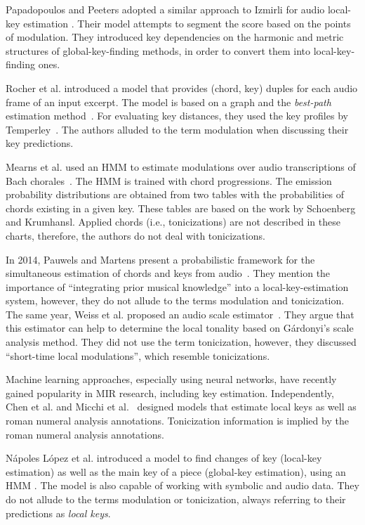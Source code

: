 \documentclass[sigconf]{acmart}
\begin{document}
Papadopoulos and Peeters adopted a similar approach to Izmirli for audio local-key estimation \cite{papadopoulos2009local}.
Their model attempts to segment the score based on the points of modulation. 
They introduced key dependencies on the harmonic and metric structures of global-key-finding methods, in order to convert them into local-key-finding ones. 

Rocher et al. introduced a model that provides (chord, key) duples for each audio frame of an input excerpt. 
The model is based on a graph and the \emph{best-path} estimation method~\cite{thomas_rocher_2010_1417485}. 
For evaluating key distances, they used the key profiles by Temperley~\cite{temperley99tonality}. The authors alluded to the term modulation when discussing their key predictions.

Mearns et al. used an HMM to estimate modulations over audio transcriptions of Bach chorales~\cite{mearns2011automatically}. 
The HMM is trained with chord progressions. 
The emission probability distributions are obtained from two tables with the probabilities of chords existing in a given key. 
These tables are based on the work by Schoenberg and Krumhansl. 
Applied chords (i.e., tonicizations) are not described in these charts, therefore, the authors do not deal with tonicizations.

In 2014, Pauwels and Martens present a probabilistic framework for the simultaneous estimation of chords and keys from audio~\cite{pauwels2014combining}. 
They mention the importance of ``integrating prior musical knowledge'' into a local-key-estimation system, however, they do not allude to the terms modulation and tonicization. 
The same year, Weiss et al. proposed an audio scale estimator~\cite{weiss2014chroma}. 
They argue that this estimator can help to determine the local tonality based on G\'{a}rdonyi's scale analysis method. 
They did not use the term tonicization, however, they discussed ``short-time local modulations'', which resemble tonicizations.

Machine learning approaches, especially using neural networks, have recently gained popularity in MIR research, including key estimation. 
Independently, Chen et al. \cite{chen18harmony,chen19harmony} and Micchi et al.~\cite{micchi20roman} designed models that estimate local keys as well as roman numeral analysis annotations. Tonicization information is implied by the roman numeral analysis annotations. 

N\'apoles L\'opez et al. introduced a model to find changes of key (local-key estimation) as well as the main key of a piece (global-key estimation), using an HMM \cite{napoleslopez2019key}. 
The model is also capable of working with symbolic and audio data. They do not allude to the terms modulation or tonicization, always referring to their predictions as \emph{local keys}.
\end{document}
